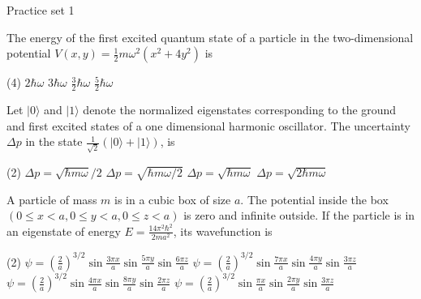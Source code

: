 \newpage
\begin{abox}
	Practice set 1
	\end{abox}
\begin{enumerate}
\begin{minipage}{\textwidth}
	\item The energy of the first excited quantum state of a particle in the two-dimensional potential $V(x, y)=\frac{1}{2} m \omega^{2}\left(x^{2}+4 y^{2}\right)$ is
\end{minipage}
\begin{tasks}(4)
	\task[\textbf{A.}] $2 \hbar \omega$
	\task[\textbf{B.}]$3 \hbar \omega$
	\task[\textbf{C.}]$\frac{3}{2} \hbar \omega$
	\task[\textbf{D.}] $\frac{5}{2} \hbar \omega$
\end{tasks}
\begin{minipage}{\textwidth}
	\item Let $|0\rangle$ and $|1\rangle$ denote the normalized eigenstates corresponding to the ground and first excited states of a one dimensional harmonic oscillator. The uncertainty $\Delta p$ in the state $\frac{1}{\sqrt{2}}(|0\rangle+|1\rangle)$, is
\end{minipage}
\begin{tasks}(2)
	\task[\textbf{A.}] $\Delta p=\sqrt{\hbar m \omega} / 2$
	\task[\textbf{B.}]$\Delta p=\sqrt{\hbar m \omega / 2}$
	\task[\textbf{C.}]$\Delta p=\sqrt{\hbar m \omega}$
	\task[\textbf{D.}]$\Delta p=\sqrt{2 \hbar m \omega}$
\end{tasks}
\begin{minipage}{\textwidth}
	\item A particle of mass $m$ is in a cubic box of size $a$. The potential inside the box $(0 \leq x<a, 0 \leq y<a, 0 \leq z<a)$ is zero and infinite outside. If the particle is in an eigenstate of energy $E=\frac{14 \pi^{2} \hbar^{2}}{2 m a^{2}}$, its wavefunction is
\end{minipage}
\begin{tasks}(2)
	\task[\textbf{A.}] $\psi=\left(\frac{2}{a}\right)^{3 / 2} \sin \frac{3 \pi x}{a} \sin \frac{5 \pi y}{a} \sin \frac{6 \pi z}{a}$
	\task[\textbf{B.}] $\psi=\left(\frac{2}{a}\right)^{3 / 2} \sin \frac{7 \pi x}{a} \sin \frac{4 \pi y}{a} \sin \frac{3 \pi z}{a}$
	\task[\textbf{C.}]$\psi=\left(\frac{2}{a}\right)^{3 / 2} \sin \frac{4 \pi x}{a} \sin \frac{8 \pi y}{a} \sin \frac{2 \pi z}{a}$
	\task[\textbf{D.}]$\psi=\left(\frac{2}{a}\right)^{3 / 2} \sin \frac{\pi x}{a} \sin \frac{2 \pi y}{a} \sin \frac{3 \pi z}{a}$

\end{tasks}
\end{enumerate}
